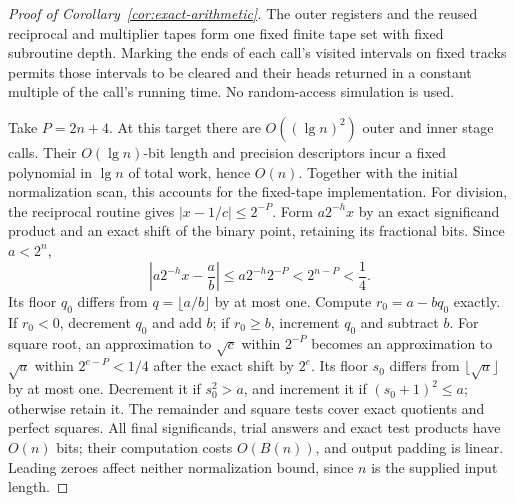 \begin{proof}[Proof of Corollary~\ref{cor:exact-arithmetic}]
The outer registers and the reused reciprocal and multiplier tapes form
one fixed finite tape set with fixed subroutine depth. Marking the ends
of each call's visited intervals on fixed tracks permits those intervals
to be cleared and their heads returned in a constant multiple of the
call's running time. No random-access simulation is used.

Take $P=2n+4$. At this target there are $O((\lg n)^2)$ outer and inner
stage calls. Their $O(\lg n)$-bit length and precision descriptors incur
a fixed polynomial in $\lg n$ of total work, hence $O(n)$. Together with
the initial normalization scan, this accounts for the fixed-tape
implementation. For division, the reciprocal routine gives
$|x-1/c|\le2^{-P}$. Form $a2^{-h}x$ by an exact significand product
and an exact shift of the binary point, retaining its fractional bits.
Since $a<2^n$,
\[
 \left|a2^{-h}x-\frac ab\right|
 \le a2^{-h}2^{-P}<2^{n-P}<\frac14.
\]
Its floor $q_0$ differs from $q=\lfloor a/b\rfloor$ by at most one.
Compute $r_0=a-bq_0$ exactly. If $r_0<0$, decrement $q_0$ and add $b$;
if $r_0\ge b$, increment $q_0$ and subtract $b$.
For square root, an approximation to $\sqrt c$ within $2^{-P}$ becomes
an approximation to $\sqrt a$ within $2^{e-P}<1/4$ after the exact
shift by $2^e$. Its floor $s_0$ differs from $\lfloor\sqrt a\rfloor$
by at most one. Decrement it if $s_0^2>a$, and increment it if
$(s_0+1)^2\le a$; otherwise retain it. The remainder and square tests
cover exact quotients and perfect squares. All final significands, trial
answers and exact test products have $O(n)$ bits; their computation costs
$O(B(n))$, and output padding is linear. Leading zeroes
affect neither normalization bound, since $n$ is the supplied input
length.
\end{proof}
